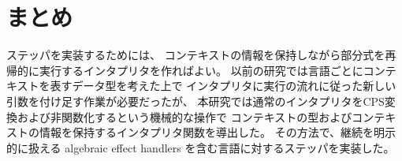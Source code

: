 \section{まとめ}
\label{section:conclusion}

ステッパを実装するためには、
コンテキストの情報を保持しながら部分式を再帰的に実行するインタプリタを作ればよい。
以前の研究\cite{FCA19}では言語ごとにコンテキストを表すデータ型を考えた上で
インタプリタに実行の流れに従った新しい引数を付け足す作業が必要だったが、
本研究では通常のインタプリタをCPS変換および非関数化するという機械的な操作で
コンテキストの型およびコンテキストの情報を保持するインタプリタ関数を導出した。
その方法で、継続を明示的に扱える algebraic effect handlers を含む言語に対するステッパを実装した。
